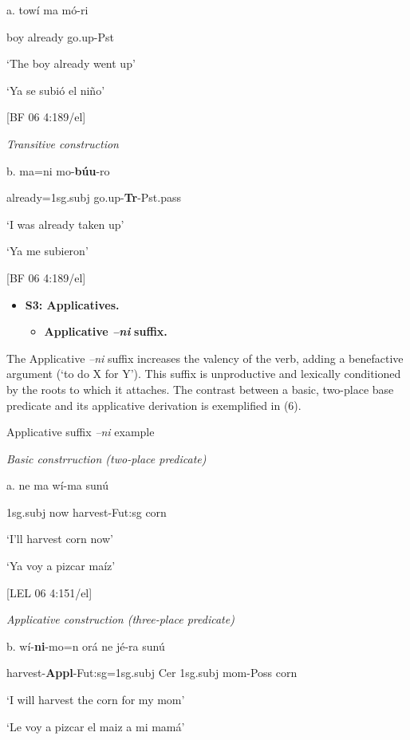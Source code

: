 a.   towí  ma     mó-ri

boy  already    go.up-Pst

‘The boy already went up’

‘Ya se subió el niño’          

[BF 06 4:189/el]

    \textit{Transitive construction}

b.   ma=ni    mo-\textbf{búu}{}-ro

  already=1sg.subj  go.up-\textbf{Tr}{}-Pst.pass

  ‘I was already taken up’

    ‘Ya me subieron’          

    [BF 06 4:189/el]

\begin{itemize}
\item \textbf{S3: Applicatives.}

\begin{itemize}
\item \textbf{Applicative \textit{–ni} }\textbf{suffix.}
\end{itemize}
\end{itemize}

The Applicative \textit{–ni} suffix increases the valency of the verb, adding a benefactive argument (‘to do X for Y’). This suffix is unproductive and lexically conditioned by the roots to which it attaches. The contrast between a basic, two-place base predicate and its applicative derivation is exemplified in (6).

   Applicative suffix \textit{–ni} example

    \textit{Basic constrruction (two-place predicate)}

a.   ne   ma  wí-ma      sunú

    1sg.subj  now  harvest-Fut:sg    corn

    ‘I’ll harvest corn now’

    ‘Ya voy a pizcar maíz’        

    [LEL 06 4:151/el]

    \textit{Applicative construction (three-place predicate)}

b.   wí-\textbf{ni}{}-mo=n       orá   ne   jé-ra     sunú

  harvest-\textbf{Appl}{}-Fut:sg=1sg.subj  Cer  1sg.subj  mom-Poss  corn

  ‘I will harvest the corn for my mom’

‘Le voy a pizcar el maiz a mi mamá’      

